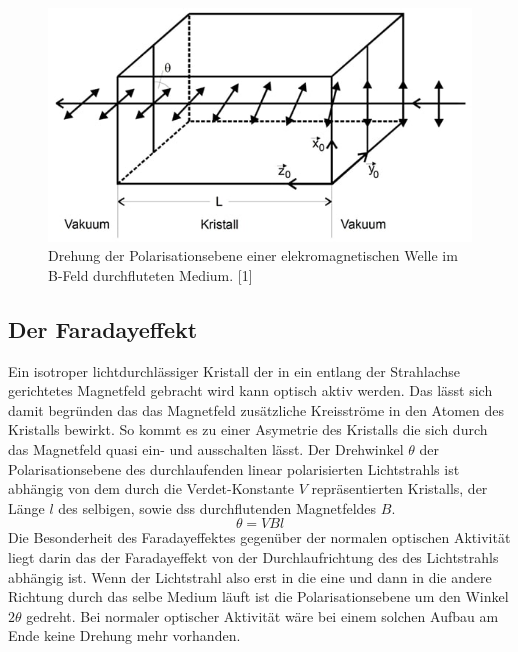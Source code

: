 \begin{figure}
  \centering
  \includegraphics[width=1\textwidth]{content/grafiken/kristall.JPG}
  \caption{Drehung der Polarisationsebene einer elekromagnetischen Welle im B-Feld durchfluteten Medium. [1]}
  \label{fig:kristall}
\end{figure}

\subsection{Der Faradayeffekt}
\label{sec:faradayeffekt}
Ein isotroper lichtdurchlässiger Kristall der in ein entlang der Strahlachse gerichtetes Magnetfeld gebracht wird 
kann optisch aktiv werden. Das lässt sich damit begründen das das Magnetfeld zusätzliche Kreisströme in den Atomen 
des Kristalls bewirkt. So kommt es zu einer Asymetrie des Kristalls die sich durch das Magnetfeld quasi ein- und ausschalten
lässt. Der Drehwinkel $\theta$ der Polarisationsebene des durchlaufenden linear polarisierten Lichtstrahls ist abhängig
von dem durch die Verdet-Konstante $V$ repräsentierten Kristalls, der Länge $l$ des selbigen, sowie dss durchflutenden
Magnetfeldes $B$.
\begin{equation*}
  \theta=VBl
\end{equation*}
Die Besonderheit des Faradayeffektes gegenüber der normalen optischen Aktivität liegt darin das der Faradayeffekt von der 
Durchlaufrichtung des des Lichtstrahls abhängig ist. Wenn der Lichtstrahl also erst in die eine und dann in die andere Richtung 
durch das selbe Medium läuft ist die Polarisationsebene um den Winkel $2\theta$ gedreht. Bei normaler optischer Aktivität 
wäre bei einem solchen Aufbau am Ende keine Drehung mehr vorhanden.
